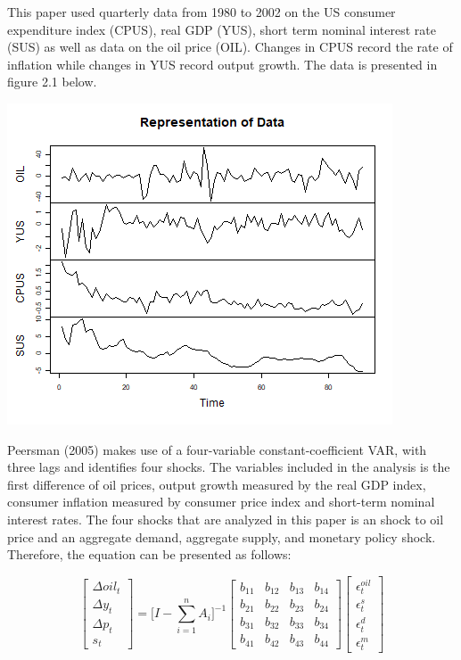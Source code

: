 \documentclass[11pt,preprint, authoryear]{elsarticle}
\let\origfigure\figure
\let\endorigfigure\endfigure
\renewenvironment{figure}[1][2] {
    \expandafter\origfigure\expandafter[H]
} {
    \endorigfigure
}
\numberwithin{equation}{section}
\numberwithin{figure}{section}
\numberwithin{table}{section}
\begin{document}
This paper used quarterly data from 1980 to 2002 on the US consumer
expenditure index (CPUS), real GDP (YUS), short term nominal interest
rate (SUS) as well as data on the oil price (OIL). Changes in CPUS
record the rate of inflation while changes in YUS record output growth.
The data is presented in figure 2.1 below.

\begin{figure}[H]

{\centering \includegraphics{replication_files/figure-latex/Figure1-1} 

}

\caption{Data\label{Figure1}}\label{fig:Figure1}
\end{figure}

Peersman (2005) makes use of a four-variable constant-coefficient VAR,
with three lags and identifies four shocks. The variables included in
the analysis is the first difference of oil prices, output growth
measured by the real GDP index, consumer inflation measured by consumer
price index and short-term nominal interest rates. The four shocks that
are analyzed in this paper is an shock to oil price and an aggregate
demand, aggregate supply, and monetary policy shock. Therefore, the
equation can be presented as follows:

\[\begin{bmatrix} \Delta oil_t \\ \Delta y_t \\ \Delta p_t \\ s_t \end{bmatrix} = \Biggl[ I - \sum_{i=1}^{n} A_i \Biggl]^{-1} \begin{bmatrix} b_{11}& b_{12}& b_{13} & b_{14} \\
b_{21}& b_{22}& b_{23} & b_{24} \\
b_{31}& b_{32}& b_{33} & b_{34} \\
b_{41}& b_{42}& b_{43} & b_{44} \end{bmatrix} \begin{bmatrix} \epsilon_t^{oil} \\ \epsilon_t^{s} \\ \epsilon_t^{d} \\ \epsilon_t^{m} \end{bmatrix}\]
\end{document}
